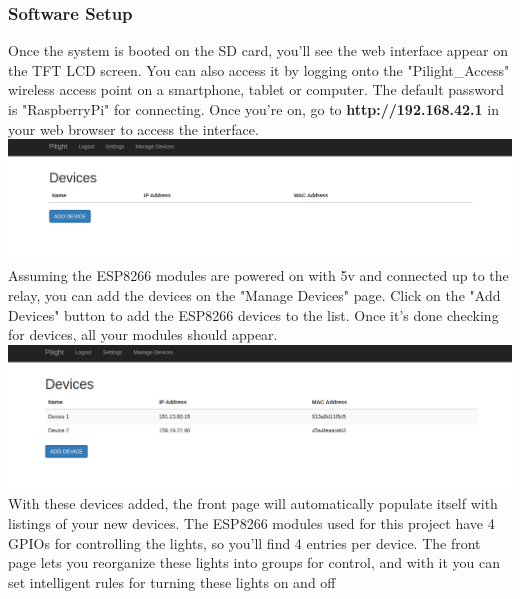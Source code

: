 \subsubsection{Software Setup}
Once the system is booted on the SD card, you'll see the web interface appear on the TFT LCD screen. You can also access it by logging onto the "Pilight\_Access" wireless access point on a smartphone, tablet or computer. The default password is "RaspberryPi" for connecting. Once you're on, go to \textbf{http://192.168.42.1} in your web browser to access the interface.\\
\includegraphics[width=1.0\textwidth]{devices.png}\\
Assuming the ESP8266 modules are powered on with 5v and connected up to the relay, you can add the devices on the "Manage Devices" page. Click on the "Add Devices" button to add the ESP8266 devices to the list. Once it's done checking for devices, all your modules should appear.\\
\includegraphics[width=1.0\textwidth]{added-devices.png}\\
With these devices added, the front page will automatically populate itself with listings of your new devices. The ESP8266 modules used for this project have 4 GPIOs for controlling the lights, so you'll find 4 entries per device. The front page lets you reorganize these lights into groups for control, and with it you can set intelligent rules for turning these lights on and off
